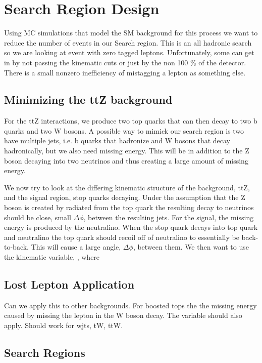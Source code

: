 \chapter{Search Region Design}
\label{ch:SR}

Using MC simulations that model the SM background for this process we want to reduce the number of events in our Search region. This is an all hadronic search so we are looking at event with zero tagged leptons. Unfortunately, some can get in by not passing the kinematic cuts or just by the non 100 \% of the detector. There is a small nonzero inefficiency of mistagging a lepton as something else. 

\section{Minimizing the ttZ background}
\label{sec:ttZBack}

For the ttZ interactions, we produce two top quarks that can then decay to two b quarks and two W bosons. A possible way to mimick our search region is two have multiple jets, i.e. b quarks that hadronize and W bosons that decay hadronically, but we also need missing energy. This will be in addition to the Z boson decaying into two neutrinos and thus creating a large amount of missing energy.

We now try to look at the differing kinematic structure of the background, ttZ, and the signal region, stop quarks decaying. Under the assumption that the Z boson is created by radiated from the top quark the resulting decay to neutrinos should be close, small $\Delta\phi$, between the resulting jets. For the signal, the missing energy is produced by the neutralino. When the stop quark decays into top quark and neutralino the top quark should recoil off of neutralino to essentially be back-to-back. This will cause a large angle, $\Delta\phi$, between them. We then want to use the kinematic variable, \dphisr, where 

\section{Lost Lepton Application}
\label{sec:ttbarsr}

Can we apply this to other backgrounds. For boosted tops the the missing energy caused by missing the lepton in the W boson decay. The variable \dphisr should also apply. Should work for wjts, tW, ttW.

\section{Search Regions}
\label{sec:SR}

